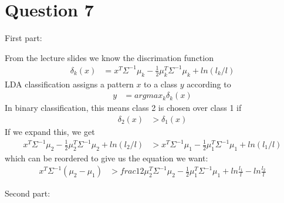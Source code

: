 \documentclass{article}
\begin{document}
\section{Question 7}

First part:

From the lecture slides we know the discrimation function
\begin{eqnarray}
\delta_k (x) &= x^T \Sigma^{-1} \mu_k - \frac{1}{2} \mu_k^T \Sigma^{-1} \mu_k + ln(l_k /l)
\end{eqnarray}
LDA classification assigns a pattern $x$ to a class $y$ according to
\begin{eqnarray}
y&=argmax_k \delta_k(x)
\end{eqnarray}
In binary classification, this means class 2 is chosen over class 1 if 
\begin{eqnarray}
\delta_2 (x) &> \delta_1 (x)
\end{eqnarray}
If we expand this, we get
\begin{eqnarray}
x^T \Sigma^{-1} \mu_2 - \frac{1}{2} \mu_2^T \Sigma^{-1} \mu_2 + ln(l_2 /l) &> x^T \Sigma^{-1} \mu_1 - \frac{1}{2} \mu_1^T \Sigma^{-1} \mu_1 + ln(l_1 /l) 
\end{eqnarray}
which can be reordered to give us the equation we want:
\begin{eqnarray}
x^T \Sigma^{-1} (\mu_2 - \mu_1) &> frac{1}{2}\mu_2^T \Sigma^{-1} \mu_2 - \frac{1}{2}\mu_1^T\Sigma^{-1}\mu_1 + ln \frac{l_1}{l} - ln \frac{l_2}{l}
\end{eqnarray}

Second part:
\end{document}
